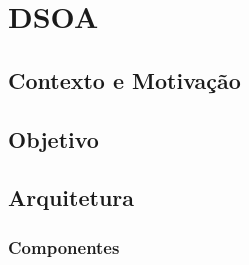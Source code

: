 \chapter{DSOA}
\label{ch:3}

\section{Contexto e Motivação}

\section{Objetivo}

\section{Arquitetura}
\label{sec:dsoa_arch}

\subsection{Componentes}

